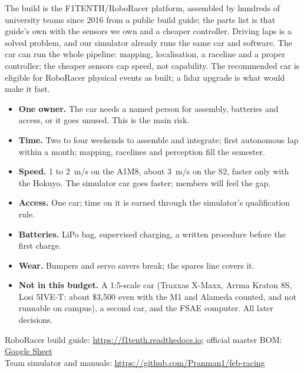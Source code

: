 \documentclass[11pt,a4paper]{article}
\begin{document}
The build is the F1TENTH/RoboRacer platform, assembled by hundreds of university teams since
2016 from a public build guide; the parts list is that guide's own with the sensors we own
and a cheaper controller. Driving laps is a solved problem, and our simulator already runs the same
car and software. The car can run the whole pipeline: mapping, localisation, a raceline and a
proper controller; the cheaper sensors cap speed, not capability. The recommended car is
eligible for RoboRacer physical events as built; a lidar upgrade is what would make it fast.

\begin{itemize}
  \item \textbf{One owner.} The car needs a named person for assembly, batteries and access, or it goes unused. This is the main risk.
  \item \textbf{Time.} Two to four weekends to assemble and integrate; first autonomous lap within a month; mapping, racelines and perception fill the semester.
  \item \textbf{Speed.} 1 to 2~m/s on the A1M8, about 3~m/s on the S2, faster only with the Hokuyo. The simulator car goes faster; members will feel the gap.
  \item \textbf{Access.} One car; time on it is earned through the simulator's qualification rule.
  \item \textbf{Batteries.} LiPo bag, supervised charging, a written procedure before the first charge.
  \item \textbf{Wear.} Bumpers and servo savers break; the spares line covers it.
  \item \textbf{Not in this budget.} A 1:5-scale car (Traxxas X-Maxx, Arrma Kraton 8S, Losi 5IVE-T: about \$3{,}500 even with the M1 and Alameda counted, and not runnable on campus), a second car, and the FSAE computer. All later decisions.
\end{itemize}

\bigskip
\noindent RoboRacer build guide: \url{https://f1tenth.readthedocs.io}; official master BOM: \href{https://docs.google.com/spreadsheets/d/1WT-UdjLTnyrb7CvHcuCxKLnRIN8DWroQ/edit}{Google Sheet}\\
Team simulator and manuals: \url{https://github.com/Pranman1/feb-racing}
\end{document}
